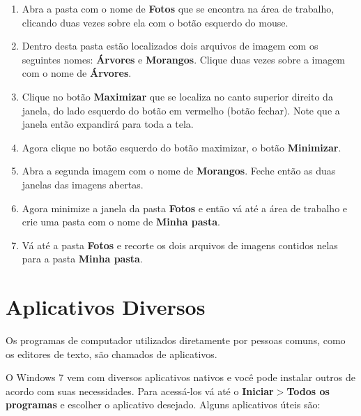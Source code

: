 \documentclass[hidelinks,12pt]{article}
\begin{document}
		\begin{enumerate}
			
			\item Abra a pasta com o nome de {\bf Fotos} que se encontra na área de trabalho, clicando duas vezes sobre ela com o botão esquerdo do mouse. 
			
			
			\item Dentro desta pasta estão localizados dois arquivos de imagem com os seguintes nomes: {\bf Árvores} e {\bf Morangos}. Clique duas vezes sobre a imagem com o nome de {\bf Árvores}.
			
			\item Clique no botão {\bf Maximizar} que se localiza no canto superior direito da janela, do lado esquerdo do botão em vermelho (botão fechar). Note que a janela então expandirá para toda a tela.
			
			\item Agora clique no botão esquerdo do botão maximizar, o botão {\bf Minimizar}.
			
			\item Abra a segunda imagem com o nome de {\bf Morangos}. Feche então as duas janelas das imagens abertas.
			
			\item Agora minimize a janela da pasta {\bf Fotos} e então vá até a área de trabalho e crie uma pasta com o nome de {\bf Minha pasta}. 
			
			\item Vá até a pasta {\bf Fotos} e recorte os dois arquivos de imagens contidos nelas para a pasta {\bf Minha pasta}.
				
		\end{enumerate}
		
		
		\section{Aplicativos Diversos}
	
			Os programas de computador utilizados diretamente por pessoas comuns, como os editores de texto, são chamados de aplicativos.
			
			O Windows 7 vem com diversos aplicativos nativos e você pode instalar outros de acordo com suas necessidades. Para acessá-los vá até o {\bf Iniciar$>$Todos os programas} e escolher o aplicativo desejado. Alguns aplicativos úteis são:
			
\end{document}
